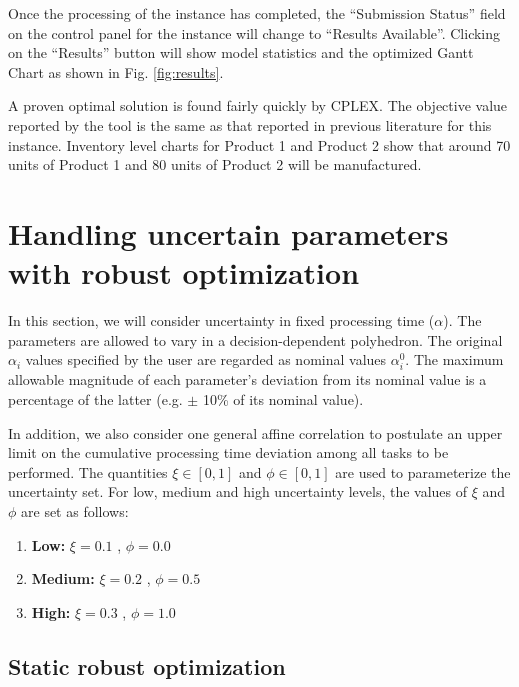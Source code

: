 Once the processing of the instance has completed, the ``Submission Status'' field on the control panel for the instance will change to ``Results Available''. Clicking on the ``Results'' button will show model statistics and the optimized Gantt Chart as shown in Fig. \ref{fig:results}.


A proven optimal solution is found fairly quickly by CPLEX. The objective value reported by the tool is the same as that reported in previous literature for this instance. Inventory level charts for Product 1 and Product 2 show that around 70 units of Product 1 and 80 units of Product 2 will be manufactured.

\section{Handling uncertain parameters with robust optimization}
In this section, we will consider uncertainty in fixed processing time ($\alpha$). The parameters are allowed to vary in a decision-dependent polyhedron. The original $\alpha_i$ values specified by the user are regarded as nominal values $\alpha_i^0$. The maximum allowable magnitude of each parameter's deviation from its nominal value is a percentage of the latter (e.g. $\pm$ 10\% of its nominal value).

In addition, we also consider one general affine correlation to postulate an upper limit on the cumulative processing time deviation among all tasks to be performed. The quantities $\xi \in [0,1]$ and $\phi \in [0,1]$ are used to parameterize the uncertainty set. For low, medium and high uncertainty levels, the values of $\xi$ and $\phi$ are set as follows:
\begin{enumerate}
\item \textbf{Low:} $\xi = 0.1$ , $\phi = 0.0$
\item \textbf{Medium:} $\xi = 0.2$ , $\phi = 0.5$
\item \textbf{High:} $\xi = 0.3$ , $\phi = 1.0$
\end{enumerate}



\subsection{Static robust optimization}

